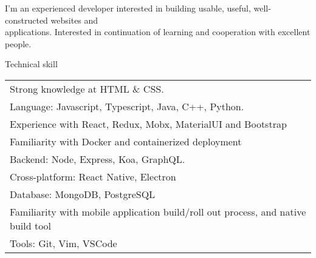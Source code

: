 \documentclass{resume}
\begin{document}

  I'm an experienced developer interested in building usable, useful, well-constructed websites and \\applications. 
  Interested in continuation of learning and cooperation with excellent people. 

  \begin{rSection}{Technical skill}
    \begin{tabular}{ @{} @{} l }
      Strong knowledge at HTML \& CSS. \\
      Language: Javascript, Typescript, Java, C++, Python. \\
      Experience with React, Redux, Mobx, MaterialUI and Bootstrap \\
      Familiarity with Docker and containerized deployment \\
      Backend: Node, Express, Koa, GraphQL. \\
      Cross-platform: React Native, Electron \\
      Database: MongoDB, PostgreSQL \\
      Familiarity with mobile application build/roll out process, and native build tool \\
      Tools: Git, Vim, VSCode
    \end{tabular}
  \end{rSection}
  
\end{document}
